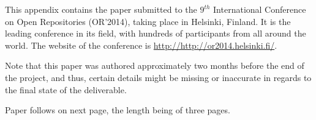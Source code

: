 
This appendix contains the paper submitted to the $9^{th}$ International Conference
on Open Repositories (OR'2014), taking place in Helsinki, Finland. It is the
leading conference in its field, with hundreds of participants from all around
the world. The website of the conference is
\url{http://http://or2014.helsinki.fi/}.

Note that this paper was authored approximately two months before the end of
the project, and thus, certain details might be missing or inaccurate in
regards to the final state of the deliverable.

Paper follows on next page, the length being of three pages.


